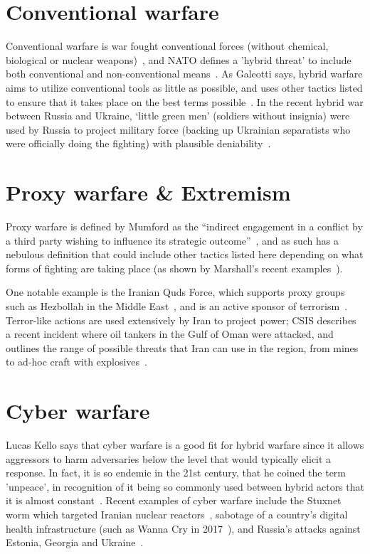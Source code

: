 \section{Conventional warfare}

Conventional warfare is war fought conventional forces (without chemical,
biological or nuclear weapons)~\cite{gortney2010department}, and NATO defines a
'hybrid threat' to include both conventional and non-conventional
means~\cite{jasper2014islamic}. As Galeotti says, hybrid warfare aims to utilize
conventional tools as little as possible, and uses other tactics listed to
ensure that it takes place on the best terms
possible~\cite[p.165]{agnieszka2015ukraine}. In the recent hybrid war between
Russia and Ukraine, `little green men' (soldiers without insignia) were used by
Russia to project military force (backing up Ukrainian separatists who were
officially doing the fighting) with plausible
deniability~\cite{lanoszka2016russian,bekkers2019hybrid}.

\section{Proxy warfare \& Extremism}

Proxy warfare is defined by Mumford as the ``indirect engagement in a conflict
by a third party wishing to influence its strategic
outcome''~\cite{mumford2013proxy}, and as such has a nebulous definition that
could include other tactics listed here depending on what forms of fighting are
taking place (as shown by Marshall's recent examples~\cite{marshall2016civil}).

One notable example is the Iranian Quds Force, which supports proxy groups such
as Hezbollah in the Middle East~\cite{jones2019war, azani2013hybrid}, and is an
active sponsor of terrorism~\cite{byman2008iran}. Terror-like actions are used
extensively by Iran to project power; CSIS describes a recent incident where oil
tankers in the Gulf of Oman were attacked, and outlines the range of possible
threats that Iran can use in the region, from mines to ad-hoc craft with
explosives~\cite{coredsman2018csis}.

\section{Cyber warfare}

Lucas Kello says that cyber warfare is a good fit for hybrid warfare since it
allows aggressors to harm adversaries below the level that would typically
elicit a response. In fact, it is so endemic in the 21st century, that he coined
the term 'unpeace', in recognition of it being so commonly used between hybrid
actors that it is almost constant~\cite{broedersmutually}. Recent examples of
cyber warfare include the Stuxnet worm which targeted Iranian nuclear
reactors~\cite{farwell2011stuxnet}, sabotage of a country's digital health
infrastructure (such as Wanna Cry in 2017~\cite{carlsson2017art}), and Russia's
attacks against Estonia, Georgia and
Ukraine~\cite{hunter2015challenges,miniats2019war,vevera2019dimensions,praks2015hybrid}.

